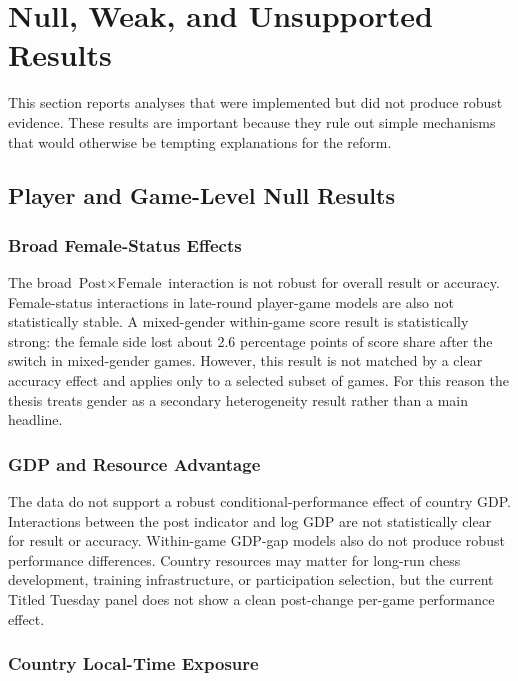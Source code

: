 \section{Null, Weak, and Unsupported Results}

This section reports analyses that were implemented but did not produce robust evidence. These results are important because they rule out simple mechanisms that would otherwise be tempting explanations for the reform.

\subsection{Player and Game-Level Null Results}

\subsubsection{Broad Female-Status Effects}

The broad \(\text{Post} \times \text{Female}\) interaction is not robust for overall result or accuracy. Female-status interactions in late-round player-game models are also not statistically stable. A mixed-gender within-game score result is statistically strong: the female side lost about 2.6 percentage points of score share after the switch in mixed-gender games. However, this result is not matched by a clear accuracy effect and applies only to a selected subset of games. For this reason the thesis treats gender as a secondary heterogeneity result rather than a main headline.

\subsubsection{GDP and Resource Advantage}

The data do not support a robust conditional-performance effect of country GDP. Interactions between the post indicator and log GDP are not statistically clear for result or accuracy. Within-game GDP-gap models also do not produce robust performance differences. Country resources may matter for long-run chess development, training infrastructure, or participation selection, but the current Titled Tuesday panel does not show a clean post-change per-game performance effect.

\subsubsection{Country Local-Time Exposure}

